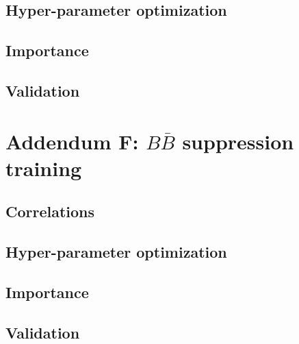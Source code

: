\documentclass[headings=standardclasses,headings=big,oneside,a4paper,openany,12pt]{scrbook}
\begin{document}
\section*{Hyper-parameter optimization}
\section*{Importance}
\section*{Validation}

\chapter*{Addendum F: $B \bar B$ suppression training}
\section*{Correlations}
\section*{Hyper-parameter optimization}
\section*{Importance}
\section*{Validation}
\end{document}
